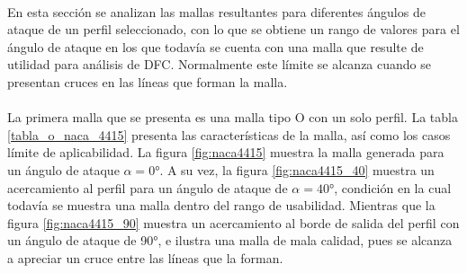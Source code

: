 \documentclass[letterpaper, openright, 12pt]{book}
\begin{document}
    \paragraph*{}
        En esta sección se analizan las mallas resultantes para diferentes
        ángulos de ataque de un perfil seleccionado, con lo que se obtiene un
        rango de valores para el ángulo de ataque en los que todavía se cuenta
        con una malla que resulte de utilidad para análisis de DFC. Normalmente
        este límite se alcanza cuando se presentan cruces en las líneas que
        forman la malla.

    \paragraph*{}
        La primera malla que se presenta es una malla tipo O con un solo perfil.
        La tabla \ref{tabla_o_naca_4415} presenta las características de la
        malla, así como los casos límite de aplicabilidad. La figura
        \ref{fig:naca4415} muestra la malla generada para un ángulo de ataque
        $\alpha = 0 \si{\degree}$. A su vez, la figura \ref{fig:naca4415_40}
        muestra un acercamiento al perfil para un ángulo de ataque de
        $\alpha = 40\si{\degree}$, condición en la cual todavía se muestra una malla dentro
        del rango de usabilidad. Mientras que la figura \ref{fig:naca4415_90}
        muestra un acercamiento al borde de salida del perfil con un ángulo de
        ataque de 90\si{\degree}, e ilustra una malla de mala calidad, pues se
        alcanza a apreciar un cruce entre las líneas que la forman.
\end{document}
